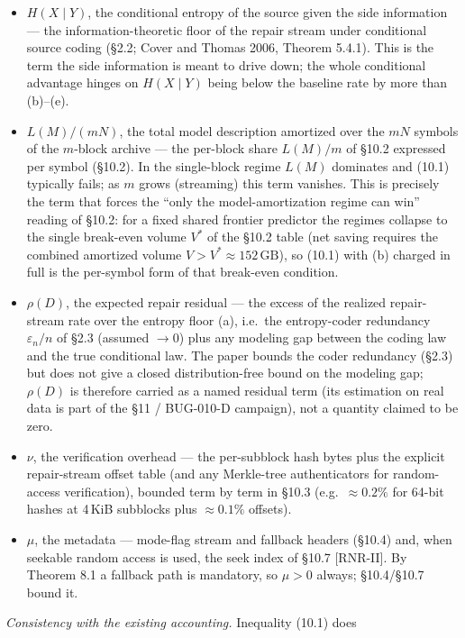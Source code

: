 \documentclass[
]{article}
\begin{document}
\begin{itemize}
\item[(a)] $H(X\mid Y)$, the conditional entropy of the source given
  the side information --- the information-theoretic floor of the
  repair stream under conditional source coding (§2.2; Cover and
  Thomas 2006, Theorem 5.4.1). This is the term the side information
  is meant to drive down; the whole conditional advantage hinges on
  $H(X\mid Y)$ being below the baseline rate by more than (b)--(e).
\item[(b)] $L(M)/(mN)$, the total model description amortized over the
  $mN$ symbols of the $m$-block archive --- the per-block share $L(M)/m$
  of §10.2 expressed per symbol (§10.2). In the single-block regime $L(M)$
  dominates and (10.1) typically fails; as $m$ grows (streaming) this
  term vanishes. This is precisely the term that forces the
  ``only the model-amortization regime can win'' reading of §10.2: for
  a fixed shared frontier predictor the regimes collapse to the single
  break-even volume $V^*$ of the §10.2 table (net saving requires the
  combined amortized volume $V>V^*\approx152\,\mathrm{GB}$), so (10.1)
  with (b) charged in full is the per-symbol form of that break-even
  condition.
\item[(c)] $\rho(D)$, the expected repair residual --- the excess of
  the realized repair-stream rate over the entropy floor (a), i.e.\ the
  entropy-coder redundancy $\varepsilon_n/n$ of §2.3 (assumed
  $\to 0$) plus any modeling gap between the coding law and the true
  conditional law. The paper bounds the coder redundancy (§2.3) but
  does not give a closed distribution-free bound on the modeling gap;
  $\rho(D)$ is therefore carried as a named residual term (its
  estimation on real data is part of the §11 / BUG-010-D campaign), not
  a quantity claimed to be zero.
\item[(d)] $\nu$, the verification overhead --- the per-subblock hash
  bytes plus the explicit repair-stream offset table (and any
  Merkle-tree authenticators for random-access verification), bounded
  term by term in §10.3 (e.g.\ $\approx0.2\%$ for 64-bit hashes at
  4\,KiB subblocks plus $\approx0.1\%$ offsets).
\item[(e)] $\mu$, the metadata --- mode-flag stream and fallback
  headers (§10.4) and, when seekable random access is used, the seek
  index of §10.7 [RNR-II]. By Theorem 8.1 a fallback path is mandatory, so
  $\mu>0$ always; §10.4/§10.7 bound it.
\end{itemize}
\emph{Consistency with the existing accounting.} Inequality (10.1) does
\end{document}
